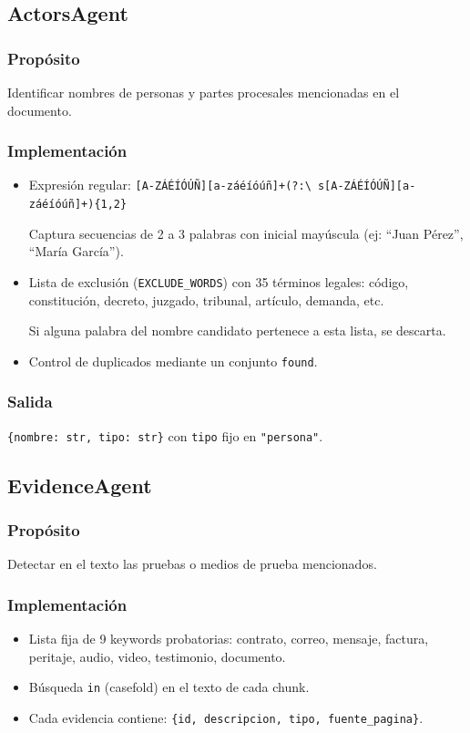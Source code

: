 \documentclass[12pt, letterpaper]{article}
\begin{document}
\subsection{ActorsAgent}

\subsubsection*{Propósito}
Identificar nombres de personas y partes procesales mencionadas en
el documento.

\subsubsection*{Implementación}
\begin{itemize}[nosep]
  \item Expresión regular:
    \texttt{[A-ZÁÉÍÓÚÑ][a-záéíóúñ]+(?:\textbackslash
    s[A-ZÁÉÍÓÚÑ][a-záéíóúñ]+)\{1,2\}}

    Captura secuencias de 2 a 3 palabras con inicial mayúscula
    (ej: ``Juan Pérez'', ``María García'').

  \item Lista de exclusión (\texttt{EXCLUDE\_WORDS}) con 35 términos
    legales: código, constitución, decreto, juzgado, tribunal,
    artículo, demanda, etc.

    Si alguna palabra del nombre candidato pertenece a esta lista,
    se descarta.

  \item Control de duplicados mediante un conjunto \texttt{found}.
\end{itemize}

\subsubsection*{Salida}
\texttt{\{nombre: str, tipo: str\}} con \texttt{tipo} fijo en
\texttt{"persona"}.

\subsection{EvidenceAgent}

\subsubsection*{Propósito}
Detectar en el texto las pruebas o medios de prueba mencionados.

\subsubsection*{Implementación}
\begin{itemize}[nosep]
  \item Lista fija de 9 keywords probatorias: contrato, correo,
    mensaje, factura, peritaje, audio, video, testimonio, documento.
  \item Búsqueda \texttt{in} (casefold) en el texto de cada chunk.
  \item Cada evidencia contiene:
    \texttt{\{id, descripcion, tipo, fuente\_pagina\}}.
\end{itemize}
\end{document}
